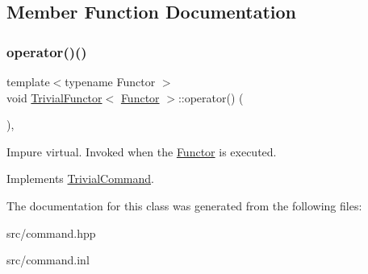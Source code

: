\subsection{Member Function Documentation}
\mbox{\label{class_trivial_functor_a5f9b8d18c11a057c2b3e97703262d1e9}} 
\subsubsection{\texorpdfstring{operator()()}{operator()()}}
{\footnotesize\ttfamily template$<$typename Functor $>$ \\
void \mbox{\hyperlink{class_trivial_functor}{Trivial\+Functor}}$<$ \mbox{\hyperlink{class_functor}{Functor}} $>$\+::operator() (\begin{DoxyParamCaption}{ }\end{DoxyParamCaption})\hspace{0.3cm}{\ttfamily [override]}, {\ttfamily [virtual]}}

Impure virtual. Invoked when the \mbox{\hyperlink{class_functor}{Functor}} is executed. 

Implements \mbox{\hyperlink{class_trivial_command_aa61a3e5fd78d3a2dec6fcf6dcb2e5189}{Trivial\+Command}}.



The documentation for this class was generated from the following files\+:\begin{DoxyCompactItemize}
\item 
src/command.\+hpp\item 
src/command.\+inl\end{DoxyCompactItemize}
